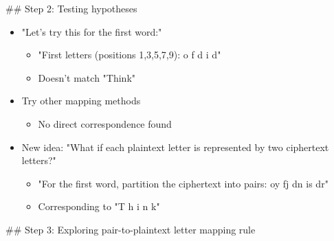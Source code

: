\documentclass{article}
\begin{document}
\begin{tcolorbox}[colback=wkblue!10!white, colframe=wkblue!100!blue, left=2mm, right=2mm, title=\small\textcolor{black}{A document from \textsc{MathPile}-Ciphers}]
\begin{tiny}
\vspace{1.6mm}

\#\# Step 2: Testing hypotheses

\begin{itemize}
    \item "Let's try this for the first word:"
    \begin{itemize}
        \item "First letters (positions 1,3,5,7,9): o f d i d"
        \item Doesn't match "Think"
    \end{itemize}
    \item Try other mapping methods
    \begin{itemize}
        \item No direct correspondence found
    \end{itemize}
    \item New idea: "What if each plaintext letter is represented by two ciphertext letters?"
    \begin{itemize}
        \item "For the first word, partition the ciphertext into pairs: oy fj dn is dr"
        \item Corresponding to "T h i n k"
    \end{itemize}
\end{itemize}

\vspace{1.6mm}

\#\# Step 3: Exploring pair-to-plaintext letter mapping rule


\end{tiny}
\end{tcolorbox}
\end{document}
